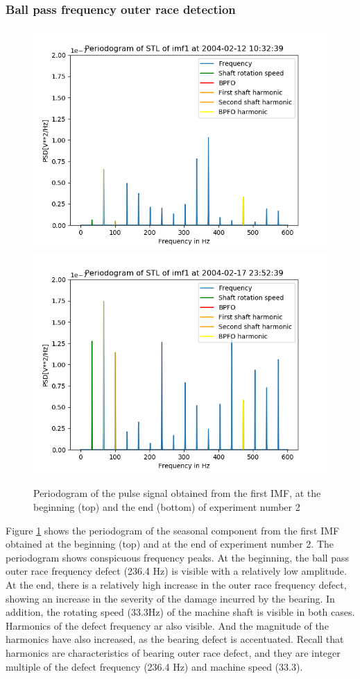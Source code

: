 \documentclass[../Main/thesis.tex]{subfiles}
\begin{document}
\subsubsection{Ball pass frequency outer race detection} 
 \begin{figure}[H]
 	\centering
 	\includegraphics[width=0.8\linewidth]{../fig/periodogram_bpfo/start_imf1_bpfo}
 	\includegraphics[width=0.8\linewidth]{../fig/periodogram_bpfo/end_imf1_bpfo}
 	\caption{Periodogram of the pulse signal obtained from the first IMF, at the beginning (top) and the end (bottom) of experiment number 2}
 	\label{fig:startimf1bpfo}
 \end{figure}
\justify
Figure \ref{fig:startimf1bpfo} shows the periodogram of the seasonal component from the first IMF obtained at the beginning (top) and at the end of experiment number 2. The periodogram shows conspicuous frequency peaks. At the beginning, the ball pass outer race frequency defect (236.4 Hz) is visible with a relatively low amplitude. At the end, there is a relatively high increase in the outer race frequency defect, showing an increase in the severity of the damage incurred by the bearing.
\justify
In addition, the rotating speed (33.3Hz) of the machine shaft is visible in both cases. Harmonics of the defect frequency ar also visible. And the magnitude of the harmonics have also increased, as the bearing defect is accentuated. Recall that harmonics are characteristics of bearing outer race defect, and they are integer multiple of the defect frequency (236.4 Hz) and machine speed (33.3).
\end{document}
